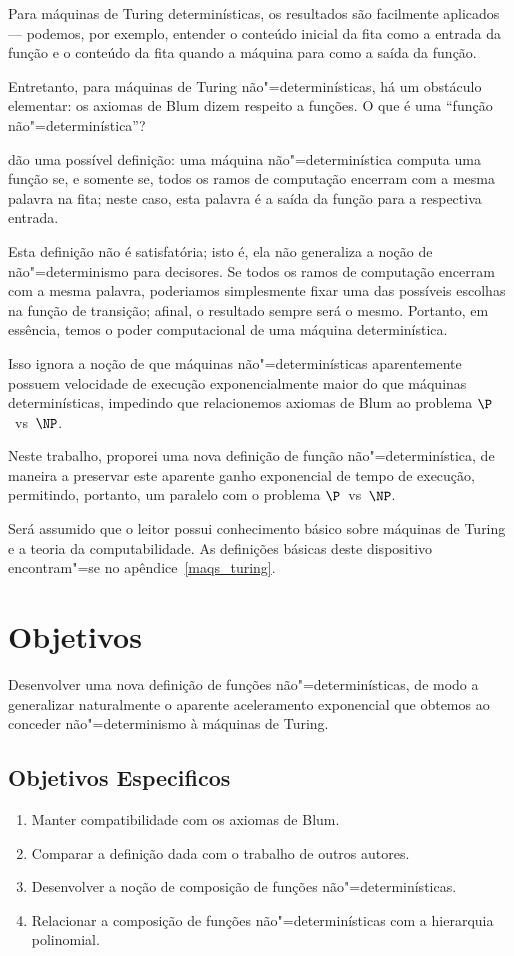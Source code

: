 Para máquinas de Turing determinísticas,
os resultados são facilmente aplicados
--- podemos, por exemplo,
entender o conteúdo inicial da fita como a entrada da função
e o conteúdo da fita quando a máquina para como a saída da função.

Entretanto, para máquinas de Turing não"=determinísticas,
há um obstáculo elementar:
os axiomas de Blum dizem respeito a funções.
O que é uma ``função não"=determinística''?

 dão uma possível definição:
uma máquina não"=determinística computa uma função se,
e somente se,
todos os ramos de computação encerram com a mesma palavra na fita;
neste caso,
esta palavra é a saída da função para a respectiva entrada.

Esta definição não é satisfatória;
isto é, ela não generaliza a noção de não"=determinismo para decisores.
Se todos os ramos de computação encerram com a mesma palavra,
poderiamos simplesmente fixar uma das possíveis escolhas na função de transição;
afinal, o resultado sempre será o mesmo.
Portanto, em essência,
temos o poder computacional de uma máquina determinística.

Isso ignora a noção de que máquinas não"=determinísticas
aparentemente possuem velocidade de execução exponencialmente maior
do que máquinas determinísticas,
impedindo que relacionemos axiomas de Blum
ao problema $\P$~vs~$\NP$.

Neste trabalho,
proporei uma nova definição de função não"=determinística,
de maneira a preservar este aparente ganho exponencial de tempo de execução,
permitindo, portanto,
um paralelo com o problema $\P$~vs~$\NP$.

Será assumido que o leitor possui conhecimento básico
sobre máquinas de Turing e a teoria da computabilidade.
As definições básicas deste dispositivo
encontram"=se no apêndice~\ref{maqs_turing}.

\section{Objetivos}

Desenvolver uma nova definição de funções não"=determinísticas,
de modo a generalizar naturalmente o aparente aceleramento exponencial
que obtemos ao conceder não"=determinismo à máquinas de Turing.

\subsection{Objetivos Especificos}

\begin{enumerate}
    \item Manter compatibilidade com os axiomas de Blum.
    \item Comparar a definição dada com o trabalho de outros autores.
    \item Desenvolver a noção de composição de funções não"=determinísticas.
    \item Relacionar a composição de funções não"=determinísticas
        com a hierarquia polinomial.
\end{enumerate}
